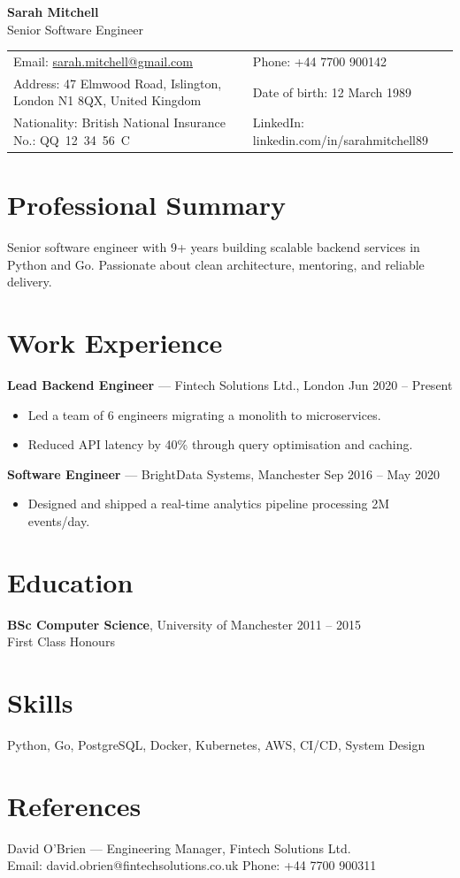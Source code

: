 \documentclass[11pt,a4paper]{article}
\begin{document}
{\Huge\bfseries\color{accent} Sarah Mitchell}\\[0.3em]
{\large Senior Software Engineer}\\[0.6em]
\begin{tabularx}{\linewidth}{@{}lX@{}}
Email: \href{mailto:sarah.mitchell@gmail.com}{sarah.mitchell@gmail.com} &
Phone: +44 7700 900142 \\
Address: 47 Elmwood Road, Islington, London N1 8QX, United Kingdom &
Date of birth: 12 March 1989 \\
Nationality: British \quad National Insurance No.: QQ~12~34~56~C &
LinkedIn: linkedin.com/in/sarahmitchell89 \\
\end{tabularx}

\section{Professional Summary}
Senior software engineer with 9+ years building scalable backend services in Python
and Go. Passionate about clean architecture, mentoring, and reliable delivery.

\section{Work Experience}
\textbf{Lead Backend Engineer} — Fintech Solutions Ltd., London \hfill Jun 2020 -- Present
\begin{itemize}
  \item Led a team of 6 engineers migrating a monolith to microservices.
  \item Reduced API latency by 40\% through query optimisation and caching.
\end{itemize}
\vspace{0.4em}
\textbf{Software Engineer} — BrightData Systems, Manchester \hfill Sep 2016 -- May 2020
\begin{itemize}
  \item Designed and shipped a real-time analytics pipeline processing 2M events/day.
\end{itemize}

\section{Education}
\textbf{BSc Computer Science}, University of Manchester \hfill 2011 -- 2015\\
First Class Honours

\section{Skills}
Python, Go, PostgreSQL, Docker, Kubernetes, AWS, CI/CD, System Design

\section{References}
David O'Brien — Engineering Manager, Fintech Solutions Ltd.\\
Email: david.obrien@fintechsolutions.co.uk \quad Phone: +44 7700 900311
\end{document}

